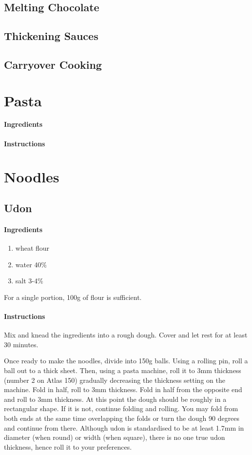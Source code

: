 \documentclass[11pt]{report}
\newcommand{\header}[1]{\subsubsection*{#1}}
\begin{document}
\section{Melting Chocolate}

\section{Thickening Sauces}

\section{Carryover Cooking}

\newpage

\chapter{Pasta}
\header{Ingredients}
\header{Instructions}

\chapter{Noodles}
\section{Udon}
\header{Ingredients}
\begin{enumerate}
  \item wheat flour
  \item water 40\%
  \item salt 3-4\%
\end{enumerate}

For a single portion, 100g of flour is sufficient.

\header{Instructions}
Mix and knead the ingredients into a rough dough. Cover and let rest for at
least 30 minutes.

Once ready to make the noodles, divide into 150g balls. Using a rolling pin,
roll a ball out to a thick sheet. Then, using a pasta machine, roll it to 3mm
thickness (number 2 on Atlas 150) gradually decreasing the thickness setting on
the machine. Fold in half, roll to 3mm thickness. Fold in half from the
opposite end and roll to 3mm thickness. At this point the dough should be
roughly in a rectangular shape. If it is not, continue folding and rolling. You
may fold from both ends at the same time overlapping the folds or turn the
dough 90 degrees and continue from there. Although udon is standardised to be
at least 1.7mm in diameter (when round) or width (when square), there is no one
true udon thickness, hence roll it to your preferences.
\end{document}
